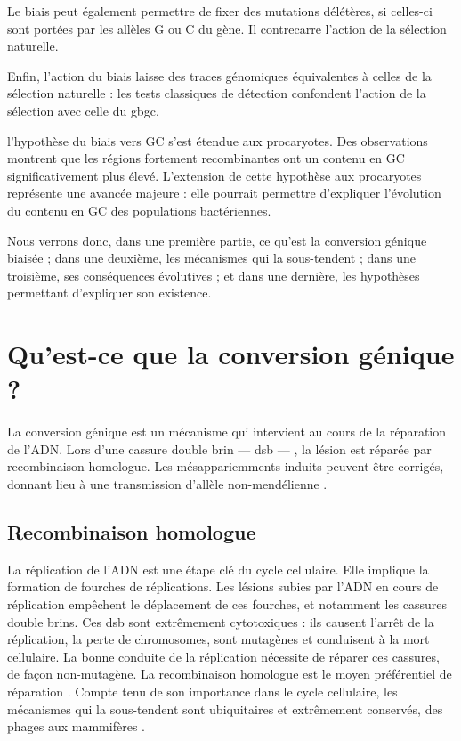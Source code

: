 \documentclass[11pt, oneside]{scrartcl}
\begin{document}
Le biais peut également permettre de fixer des mutations délétères, si celles-ci sont
portées par les allèles G ou C du gène. Il contrecarre l'action de la sélection
naturelle. 

Enfin, l'action du biais laisse des traces génomiques équivalentes à celles de
la sélection naturelle : les tests classiques de détection confondent l'action
de la sélection avec celle du \ac{gbgc}.


 l'hypothèse du biais vers GC s'est étendue aux
procaryotes. Des observations montrent que les régions fortement recombinantes
ont un contenu en GC significativement plus élevé. L'extension de cette
hypothèse aux procaryotes représente une avancée majeure : elle pourrait
permettre d'expliquer l'évolution du contenu en GC des populations bactériennes.

Nous verrons donc, dans une première partie, ce qu'est la conversion génique
biaisée ; dans une deuxième, les mécanismes qui la sous-tendent ; dans une
troisième, ses conséquences évolutives ; et dans une dernière, les hypothèses
permettant d'expliquer son existence.

\section{Qu'est-ce que la conversion génique ?}
\label{sec:orgheadline5}

La conversion génique est un mécanisme qui intervient au cours de la réparation
de l'ADN. Lors d'une cassure double brin --- \ac{dsb} --- , la lésion est réparée par
recombinaison homologue. Les mésappariemments induits peuvent être corrigés,
donnant lieu à une transmission d'allèle non-mendélienne \cite{chen_mechanism_2008}. 

\subsection{Recombinaison homologue}
\label{sec:orgheadline2}

La réplication de l'ADN est une étape clé du cycle cellulaire. Elle implique la
formation de fourches de réplications. Les lésions subies par l'ADN en cours de
réplication empêchent le déplacement de ces fourches, et notamment les cassures
double brins. Ces \ac{dsb} sont extrêmement cytotoxiques : ils causent l'arrêt
de la réplication, la perte de chromosomes, sont mutagènes et conduisent à la
mort cellulaire\cite{watson_molecular_2014}. La bonne conduite de la réplication
nécessite de réparer ces cassures, de façon non-mutagène. La recombinaison
homologue est le moyen préférentiel de réparation \cite{lusetti_bacterial_2002}.
Compte tenu de son importance dans le cycle cellulaire, les mécanismes qui la
sous-tendent sont ubiquitaires et extrêmement conservés, des phages aux
mammifères \cite{cromie_recombination_2001}.
\end{document}
